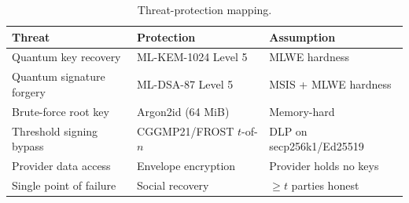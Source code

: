 \begin{table}[h]
\centering
\small
\begin{tabular}{@{}lll@{}}
\toprule
\textbf{Threat} & \textbf{Protection} & \textbf{Assumption} \\
\midrule
Quantum key recovery       & ML-KEM-1024 Level 5 & MLWE hardness \\
Quantum signature forgery  & ML-DSA-87 Level 5   & MSIS + MLWE hardness \\
Brute-force root key       & Argon2id (64 MiB)   & Memory-hard \\
Threshold signing bypass   & CGGMP21/FROST $t$-of-$n$ & DLP on secp256k1/Ed25519 \\
Provider data access       & Envelope encryption  & Provider holds no keys \\
Single point of failure    & Social recovery      & $\geq t$ parties honest \\
\bottomrule
\end{tabular}
\caption{Threat-protection mapping.}
\label{tab:threats}
\end{table}

